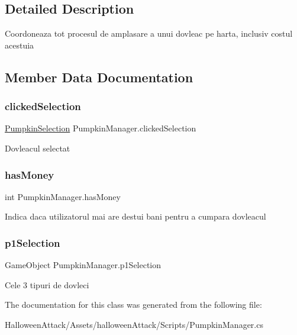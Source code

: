 \subsection{Detailed Description}
Coordoneaza tot procesul de amplasare a unui dovleac pe harta, inclusiv costul acestuia 

\subsection{Member Data Documentation}
\mbox{\label{class_pumpkin_manager_ab4437ea939dfb4ec5c00c35b7962209c}} 
\subsubsection{\texorpdfstring{clicked\+Selection}{clickedSelection}}
{\footnotesize\ttfamily \hyperlink{class_pumpkin_selection}{Pumpkin\+Selection} Pumpkin\+Manager.\+clicked\+Selection}

Dovleacul selectat \mbox{\label{class_pumpkin_manager_a4286037e6502dd8f5b9d9ef22b513bb9}} 
\subsubsection{\texorpdfstring{has\+Money}{hasMoney}}
{\footnotesize\ttfamily int Pumpkin\+Manager.\+has\+Money\hspace{0.3cm}{\ttfamily [static]}}

Indica daca utilizatorul mai are destui bani pentru a cumpara dovleacul \mbox{\label{class_pumpkin_manager_aa64ea8a9e81650b43409b291f9bd5e20}} 
\subsubsection{\texorpdfstring{p1\+Selection}{p1Selection}}
{\footnotesize\ttfamily Game\+Object Pumpkin\+Manager.\+p1\+Selection}

Cele 3 tipuri de dovleci 

The documentation for this class was generated from the following file\+:\begin{DoxyCompactItemize}
\item 
Halloween\+Attack/\+Assets/halloween\+Attack/\+Scripts/Pumpkin\+Manager.\+cs\end{DoxyCompactItemize}

